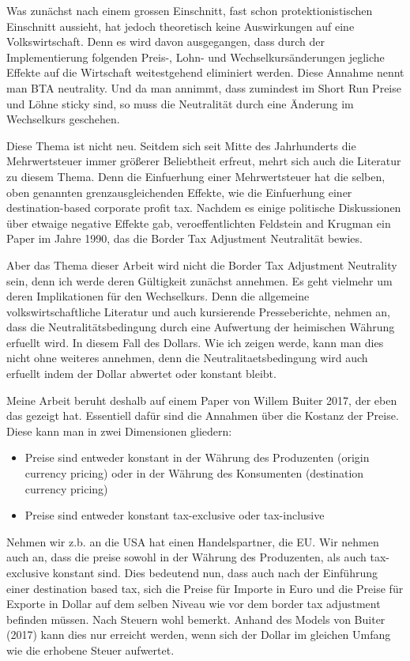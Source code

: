 Was zunächst nach einem grossen Einschnitt, fast schon protektionistischen Einschnitt aussieht, hat jedoch theoretisch keine Auswirkungen auf eine Volkswirtschaft. Denn es wird davon ausgegangen, dass durch der Implementierung folgenden Preis-, Lohn- und Wechselkursänderungen jegliche Effekte auf die Wirtschaft weitestgehend eliminiert werden. Diese Annahme nennt man BTA neutrality. Und da man annimmt, dass zumindest im Short Run Preise und Löhne sticky sind, so muss die Neutralität durch eine Änderung im Wechselkurs geschehen. 

Diese Thema ist nicht neu. Seitdem sich seit Mitte des Jahrhunderts die Mehrwertsteuer immer größerer Beliebtheit erfreut, mehrt sich auch die Literatur zu diesem Thema. Denn die Einfuerhung einer Mehrwertsteuer hat die selben, oben genannten grenzausgleichenden Effekte, wie die Einfuerhung einer destination-based corporate profit tax. Nachdem es einige politische Diskussionen über etwaige negative Effekte gab, veroeffentlichten Feldstein and Krugman ein Paper im Jahre 1990, das die Border Tax Adjustment Neutralität bewies. 

Aber das Thema dieser Arbeit wird nicht die Border Tax Adjustment Neutrality sein, denn ich werde deren Gültigkeit zunächst annehmen. Es geht vielmehr um deren Implikationen für den Wechselkurs. Denn die allgemeine volkswirtschaftliche Literatur und auch kursierende Presseberichte, nehmen an, dass die Neutralitätsbedingung durch eine Aufwertung der heimischen Währung erfuellt wird. In diesem Fall des Dollars. Wie ich zeigen werde, kann man dies nicht ohne weiteres annehmen, denn die Neutralitaetsbedingung wird auch erfuellt indem der Dollar abwertet oder konstant bleibt. 

Meine Arbeit beruht deshalb auf einem Paper von Willem Buiter 2017, der eben das gezeigt hat. 
Essentiell dafür sind die Annahmen über die Kostanz der Preise. Diese kann man in zwei Dimensionen gliedern:

\begin{itemize}
    \item Preise sind entweder konstant in der Währung des Produzenten (origin currency pricing) oder in der Währung des Konsumenten (destination currency pricing)
    \item Preise sind entweder konstant tax-exclusive oder tax-inclusive
\end{itemize}

Nehmen wir z.b. an die USA hat einen Handelspartner, die EU. Wir nehmen auch an, dass die preise sowohl in der Währung des Produzenten, als auch tax-exclusive konstant sind. Dies bedeutend nun, dass auch nach der Einführung einer destination based tax, sich die Preise für Importe in Euro und die Preise für Exporte in Dollar auf dem selben Niveau wie vor dem border tax adjustment befinden müssen. Nach Steuern wohl bemerkt. 
Anhand des Models von Buiter (2017) kann dies nur erreicht werden, wenn sich der Dollar im gleichen Umfang wie die erhobene Steuer aufwertet. 

